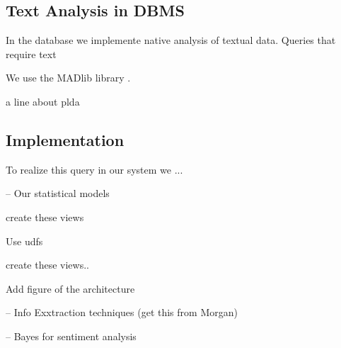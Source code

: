 \subsection{Text Analysis in DBMS}


In the database we implemente native analysis of textual
data. Queries that require text

We use the MADlib library \cite{Cohen:2009:MSN:1687553.1687576}.

a line about plda 

\subsection{{\system} Implementation}
To realize this query in our system we ...

-- Our statistical models

create these views

Use udfs

create these views..

Add figure of the architecture

-- Info Exxtraction techniques (get this from Morgan)

-- Bayes  for sentiment analysis



